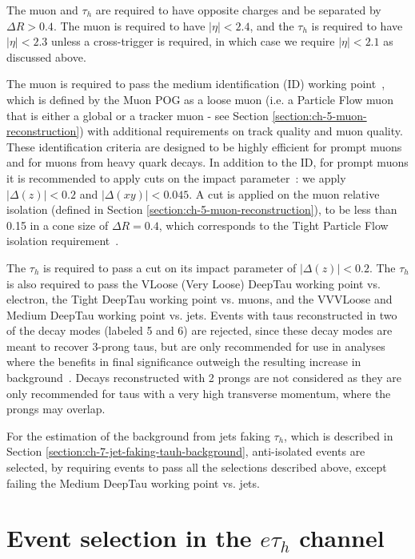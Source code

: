 The muon and $\tau_h$ are required to have opposite charges and be separated by $\Delta R > 0.4$. The muon is required to have $|\eta| < 2.4$, and the $\tau_{h}$ is required to have $|\eta| < 2.3$ unless a cross-trigger is required, in which case we require $|\eta| < 2.1$ as discussed above.

The muon is required to pass the medium identification (ID) working point~\cite{twiki_MUON_POG_Run2_guide}, which is defined by the Muon POG as a loose muon (i.e. a Particle Flow muon that is either a global or a tracker muon - see Section \ref{section:ch-5-muon-reconstruction}) with additional requirements on track quality and muon quality. These identification criteria are designed to be highly efficient for prompt muons and for muons from heavy quark decays. In addition to the ID, for prompt muons it is recommended to apply cuts on the impact parameter~\cite{twiki_MUON_POG_Run2_guide}: we apply $|\Delta(z)| < 0.2$ and $|\Delta(xy)| < 0.045$. A cut is applied on the muon relative isolation (defined in Section \ref{section:ch-5-muon-reconstruction}), to be less than 0.15 in a cone size of $\Delta R = 0.4$, which corresponds to the Tight Particle Flow isolation requirement~\cite{twiki_MUON_POG_Run2_guide}.

The $\tau_h$ is required to pass a cut on its impact parameter of $|\Delta(z)| < 0.2$. The $\tau_h$ is also required to pass the VLoose (Very Loose) DeepTau working point vs. electron, the Tight DeepTau working point vs. muons, and the VVVLoose and Medium DeepTau working point vs. jets. Events with taus reconstructed in two of the decay modes (labeled 5 and 6) are rejected, since these decay modes are meant to recover 3-prong taus, but are only recommended for use in analyses where the benefits in final significance outweigh the resulting increase in background~\cite{twiki_TAU_POG_tauidrecommendationforrun2}. Decays reconstructed with 2 prongs are not considered as they are only recommended for taus with a very high transverse momentum, where the prongs may overlap.

For the estimation of the background from jets faking $\tau_{h}$, which is described in Section \ref{section:ch-7-jet-faking-tauh-background}, anti-isolated events are selected, by requiring events to pass all the selections described above, except failing the Medium DeepTau working point vs. jets.

\section{Event selection in the \texorpdfstring{$e\tau_{h}$}{etauh} channel}
\label{section:ch-6-event-selection-etau}

